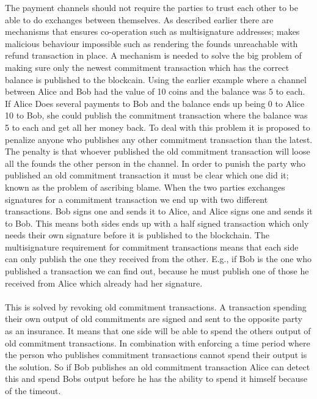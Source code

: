 \documentclass[informationsecurity]{gucmasterproject}
\begin{document}
The payment channels should not require the parties to trust each other to be able to do exchanges between themselves.
As described earlier there are mechanisms that ensures co-operation such as multisignature addresses; makes malicious behaviour impossible such as rendering the founds unreachable with refund transaction in place. A mechanism is needed to solve the big problem of making sure only the newest commitment transaction which has the correct balance is published to the blockcain. Using the earlier example where a channel between Alice and Bob had the value of 10 coins and the balance was 5 to each. If Alice Does several payments to Bob and the balance ends up being 0 to Alice 10 to Bob, she could publish the commitment transaction where the balance was 5 to each and get all her money back. To deal with this problem it is proposed to penalize anyone who publishes any other commitment transaction than the latest. The penalty is that whoever published the old commitment transaction will loose all the founds the other person in the channel.
In order to punish the party who published an old commitment transaction it must be clear which one did it; known as the problem of ascribing blame. When the two parties exchanges signatures for a commitment transaction we end up with two different transactions. Bob signs one and sends it to Alice, and Alice signs one and sends it to Bob. This means both sides ends up with a half signed transaction which only needs their own signature before it is published to the blockchain. The multisignature requirement for commitment transactions means that each side can only publish the one they received from the other.
E.g., if Bob is the one who published a transaction we can find out, because he must publish one of those he received from Alice which already had her signature.

\paragraph{}
This is solved by revoking old commitment transactions. A transaction spending their own output of old commitments are signed and sent to the opposite party as an insurance. It means that one side will be able to spend the others output of old commitment transactions. In combination with enforcing a time period where the person who publishes commitment transactions cannot spend their output is the solution. So if Bob publishes an old commitment transaction Alice can detect this and spend Bobs output before he has the ability to spend it himself because of the timeout.
\end{document}
